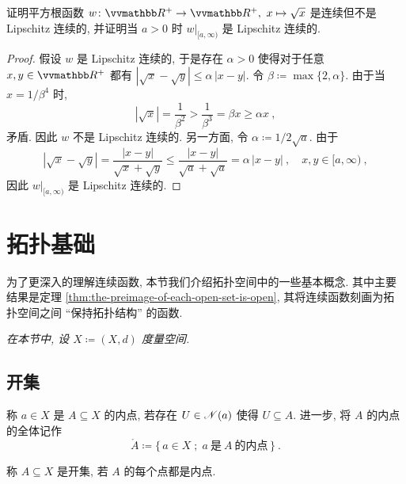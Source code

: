 \begin{exercise}\label{ex:continuous-but-not-lipschitz-continuous}
    证明平方根函数 \(w \colon \R^+ \to \R^+,\ x \mapsto \sqrt{x}\) 是连续但不是 Lipschitz 连续的, 并证明当 \(a > 0\) 时 \(w|_{[a, \infty)}\) 是 Lipschitz 连续的.
\end{exercise}

\begin{proof}
    假设 \(w\) 是 Lipschitz 连续的, 于是存在 \(\alpha > 0\) 使得对于任意 \(x, y \in \R^+\) 都有 \(|\sqrt{x} - \sqrt{y}| \leq \alpha\, |x - y|\). 令 \(\beta \coloneqq \max\{2, \alpha\}\). 由于当 \(x = 1 / \beta^4\) 时,
    \[
        |\sqrt{x}| = \frac{1}{\beta^2} > \frac{1}{\beta^3} = \beta x \geq \alpha x\ ,
    \]
    矛盾. 因此 \(w\) 不是 Lipschitz 连续的. 另一方面, 令 \(\alpha \coloneqq 1 / 2 \sqrt{a}\). 由于
    \[
        |\sqrt{x} - \sqrt{y}| = \frac{|x - y|}{\sqrt{x} + \sqrt{y}} \leq \frac{|x - y|}{\sqrt{a} + \sqrt{a}} = \alpha\, |x - y|\ ,\quad x, y \in [a, \infty)\ ,
    \]
    因此 \(w|_{[a, \infty)}\) 是 Lipschitz 连续的.
\end{proof}

\newpage

\section{拓扑基础}

为了更深入的理解连续函数, 本节我们介绍拓扑空间中的一些基本概念. 其中主要结果是定理 \ref{thm:the-preimage-of-each-open-set-is-open}, 其将连续函数刻画为拓扑空间之间 ``保持拓扑结构'' 的函数.

\begin{center}
    \textsl{在本节中, 设 \(X \coloneqq (X, d)\) 度量空间.}
\end{center}

\subsection{开集}

\begin{definition}[内点]
    称 \(a \in X\) 是 \(A \subseteq X\) 的内点, 若存在 \(U \in \mathscr N(a)\) 使得 \(U \subseteq A\). 进一步, 将 \(A\) 的内点的全体记作
    \[
        \mathring A \coloneqq \{\, a \in X \;;\; a\ \text{是}\ A\ \text{的内点} \,\}\ .
    \]
\end{definition}

\begin{definition}[开集]
    称 \(A \subseteq X\) 是开集, 若 \(A\) 的每个点都是内点.
\end{definition}


